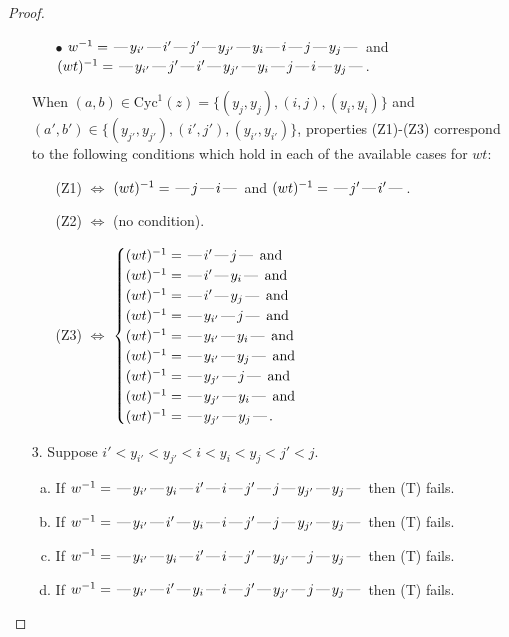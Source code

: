 \documentclass[10pt]{article}
\theoremstyle{definition}
\theoremstyle{definition}
\def\dash{\text{\hspace{0.5mm}---\hspace{0.5mm}}}
\def\Cyc{\mathrm{Cyc}}
\begin{document}
\begin{proof}
\begin{enumerate}
\begin{enumerate}
\item[$\bullet$] $w^{-1} = \dash y_{i'}\dash i'\dash j'\dash y_{j'}\dash y_i\dash i\dash j\dash y_j\dash $ and $(wt)^{-1} = \dash y_{i'}\dash j'\dash i'\dash y_{j'}\dash y_i\dash j\dash i\dash y_j\dash $.
\end{enumerate}
When $(a,b)\in\Cyc^1(z)=\{(y_j,y_j),(i,j),(y_i,y_i)\}$ and $(a',b')\in\{(y_{j'},y_{j'}),(i',j'),(y_{i'},y_{i'})\}$,
properties (Z1)-(Z3) correspond to the following conditions which
hold in each of the available cases for $wt$:
\begin{enumerate}
\item[](Z1) $\Leftrightarrow$ $(wt)^{-1} = \dash j \dash i \dash$  and $(wt)^{-1} = \dash j' \dash i' \dash$.
\item[](Z2) $\Leftrightarrow$ (no condition).
\item[](Z3) $\Leftrightarrow$ $\begin{cases}\text{$(wt)^{-1} = \dash i' \dash j \dash$}\text{ and }\\
\text{$(wt)^{-1} = \dash i' \dash y_i \dash$}\text{ and }\\
\text{$(wt)^{-1} = \dash i' \dash y_j \dash$}\text{ and }\\
\text{$(wt)^{-1} = \dash y_{i'} \dash j \dash$}\text{ and }\\
\text{$(wt)^{-1} = \dash y_{i'} \dash y_i \dash$}\text{ and }\\
\text{$(wt)^{-1} = \dash y_{i'} \dash y_j \dash$}\text{ and }\\
\text{$(wt)^{-1} = \dash y_{j'} \dash j \dash$}\text{ and }\\
\text{$(wt)^{-1} = \dash y_{j'} \dash y_i \dash$}\text{ and }\\
\text{$(wt)^{-1} = \dash y_{j'} \dash y_j \dash$}.\end{cases}$
\end{enumerate}
\item[$3$.] Suppose $i' < y_{i'} < y_{j'} < i < y_i < y_j < j' < j$.
\begin{enumerate}[(a)]
\item If $w^{-1} = \dash y_{i'}\dash y_i\dash i'\dash i\dash j'\dash j\dash y_{j'}\dash y_j\dash $ then (T) fails.
\item If $w^{-1} = \dash y_{i'}\dash i'\dash y_i\dash i\dash j'\dash j\dash y_{j'}\dash y_j\dash $ then (T) fails.
\item If $w^{-1} = \dash y_{i'}\dash y_i\dash i'\dash i\dash j'\dash y_{j'}\dash j\dash y_j\dash $ then (T) fails.
\item If $w^{-1} = \dash y_{i'}\dash i'\dash y_i\dash i\dash j'\dash y_{j'}\dash j\dash y_j\dash $ then (T) fails.

\end{enumerate}
\end{enumerate}
\end{proof}
\end{document}
